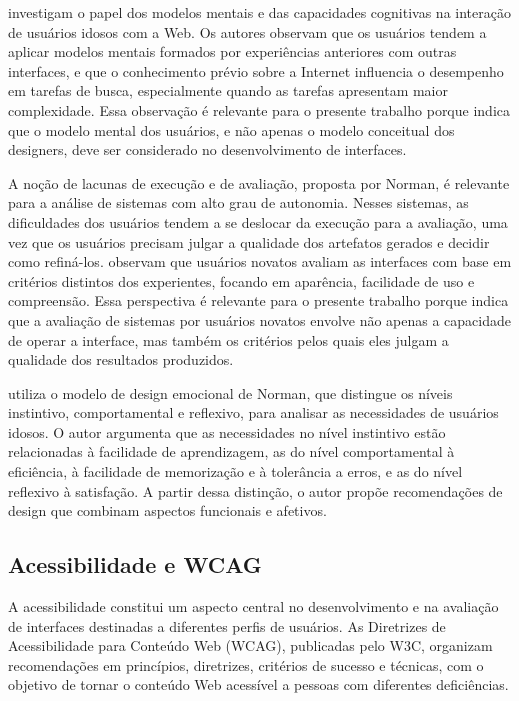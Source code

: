 \cite{sharit2008information} investigam o papel dos modelos mentais e das capacidades cognitivas na interação de usuários idosos com a Web. Os autores observam que os usuários tendem a aplicar modelos mentais formados por experiências anteriores com outras interfaces, e que o conhecimento prévio sobre a Internet influencia o desempenho em tarefas de busca, especialmente quando as tarefas apresentam maior complexidade. Essa observação é relevante para o presente trabalho porque indica que o modelo mental dos usuários, e não apenas o modelo conceitual dos designers, deve ser considerado no desenvolvimento de interfaces.

A noção de lacunas de execução e de avaliação, proposta por Norman, é relevante para a análise de sistemas com alto grau de autonomia. Nesses sistemas, as dificuldades dos usuários tendem a se deslocar da execução para a avaliação, uma vez que os usuários precisam julgar a qualidade dos artefatos gerados e decidir como refiná-los. \cite{nosseir2011novice} observam que usuários novatos avaliam as interfaces com base em critérios distintos dos experientes, focando em aparência, facilidade de uso e compreensão. Essa perspectiva é relevante para o presente trabalho porque indica que a avaliação de sistemas por usuários novatos envolve não apenas a capacidade de operar a interface, mas também os critérios pelos quais eles julgam a qualidade dos resultados produzidos.

\cite{wang2020research} utiliza o modelo de design emocional de Norman, que distingue os níveis instintivo, comportamental e reflexivo, para analisar as necessidades de usuários idosos. O autor argumenta que as necessidades no nível instintivo estão relacionadas à facilidade de aprendizagem, as do nível comportamental à eficiência, à facilidade de memorização e à tolerância a erros, e as do nível reflexivo à satisfação. A partir dessa distinção, o autor propõe recomendações de design que combinam aspectos funcionais e afetivos.

\subsection{Acessibilidade e WCAG}

\label{sec:wcag}

A acessibilidade constitui um aspecto central no desenvolvimento e na avaliação de interfaces destinadas a diferentes perfis de usuários. As Diretrizes de Acessibilidade para Conteúdo Web (WCAG), publicadas pelo W3C, organizam recomendações em princípios, diretrizes, critérios de sucesso e técnicas, com o objetivo de tornar o conteúdo Web acessível a pessoas com diferentes deficiências.

